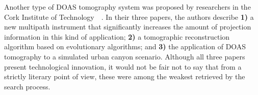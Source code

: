 Another type of \gls{DOAS} tomography system was proposed by researchers
in the Cork Institute of
Technology~\cite{ODriscoll2003,ODriscoll2003a}~.
In their three papers, the authors describe \textbf{1)} a new multipath
instrument that significantly increases the amount of projection
information in this kind of application; \textbf{2)} a tomographic
reconstruction algorithm based on evolutionary algorithms; and
\textbf{3)} the application of \gls{DOAS} tomography to a simulated
urban canyon scenario. Although all three papers present technological
innovation, it would not be fair not to say that from a strictly
literary point of view, these were among the weakest retrieved by the
search process.  






